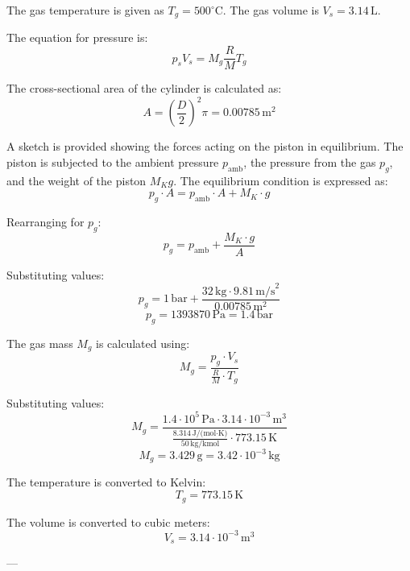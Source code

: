 The gas temperature is given as \( T_g = 500^\circ\text{C} \).  
The gas volume is \( V_s = 3.14 \, \text{L} \).  

The equation for pressure is:  
\[
p_s V_s = M_g \frac{R}{M} T_g
\]  

The cross-sectional area of the cylinder is calculated as:  
\[
A = \left( \frac{D}{2} \right)^2 \pi = 0.00785 \, \text{m}^2
\]  

A sketch is provided showing the forces acting on the piston in equilibrium. The piston is subjected to the ambient pressure \( p_{\text{amb}} \), the pressure from the gas \( p_g \), and the weight of the piston \( M_K g \). The equilibrium condition is expressed as:  
\[
p_g \cdot A = p_{\text{amb}} \cdot A + M_K \cdot g
\]  

Rearranging for \( p_g \):  
\[
p_g = p_{\text{amb}} + \frac{M_K \cdot g}{A}
\]  

Substituting values:  
\[
p_g = 1 \, \text{bar} + \frac{32 \, \text{kg} \cdot 9.81 \, \text{m/s}^2}{0.00785 \, \text{m}^2}
\]  
\[
p_g = 1393870 \, \text{Pa} = 1.4 \, \text{bar}
\]  

The gas mass \( M_g \) is calculated using:  
\[
M_g = \frac{p_g \cdot V_s}{\frac{R}{M} \cdot T_g}
\]  

Substituting values:  
\[
M_g = \frac{1.4 \cdot 10^5 \, \text{Pa} \cdot 3.14 \cdot 10^{-3} \, \text{m}^3}{\frac{8.314 \, \text{J/(mol·K)}}{50 \, \text{kg/kmol}} \cdot 773.15 \, \text{K}}
\]  
\[
M_g = 3.429 \, \text{g} = 3.42 \cdot 10^{-3} \, \text{kg}
\]  

The temperature is converted to Kelvin:  
\[
T_g = 773.15 \, \text{K}
\]  

The volume is converted to cubic meters:  
\[
V_s = 3.14 \cdot 10^{-3} \, \text{m}^3
\]  

---